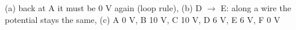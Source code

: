 (a) back at A it must be 0 V again (loop rule), (b) D $\to$ E: along a wire the potential stays the same, (c) A 0 V, B 10 V, C 10 V, D 6 V, E 6 V, F 0 V
